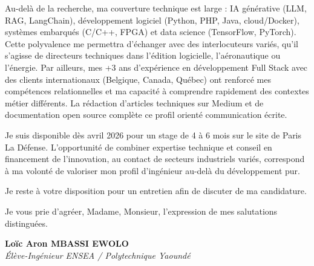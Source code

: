 \documentclass[a4paper,11pt]{article}
\begin{document}
Au-delà de la recherche, ma couverture technique est large : IA générative (LLM, RAG, LangChain), développement logiciel (Python, PHP, Java, cloud/Docker), systèmes embarqués (C/C++, FPGA) et data science (TensorFlow, PyTorch). Cette polyvalence me permettra d'échanger avec des interlocuteurs variés, qu'il s'agisse de directeurs techniques dans l'édition logicielle, l'aéronautique ou l'énergie. Par ailleurs, mes +3 ans d'expérience en développement Full Stack avec des clients internationaux (Belgique, Canada, Québec) ont renforcé mes compétences relationnelles et ma capacité à comprendre rapidement des contextes métier différents. La rédaction d'articles techniques sur Medium et de documentation open source complète ce profil orienté communication écrite.

Je suis disponible dès avril 2026 pour un stage de 4 à 6 mois sur le site de Paris La Défense. L'opportunité de combiner expertise technique et conseil en financement de l'innovation, au contact de secteurs industriels variés, correspond à ma volonté de valoriser mon profil d'ingénieur au-delà du développement pur.

Je reste à votre disposition pour un entretien afin de discuter de ma candidature.

Je vous prie d'agréer, Madame, Monsieur, l'expression de mes salutations distinguées.

\vspace{0.8cm}

\textbf{Loïc Aron MBASSI EWOLO}\\
\textit{Élève-Ingénieur ENSEA / Polytechnique Yaoundé}
\end{document}
